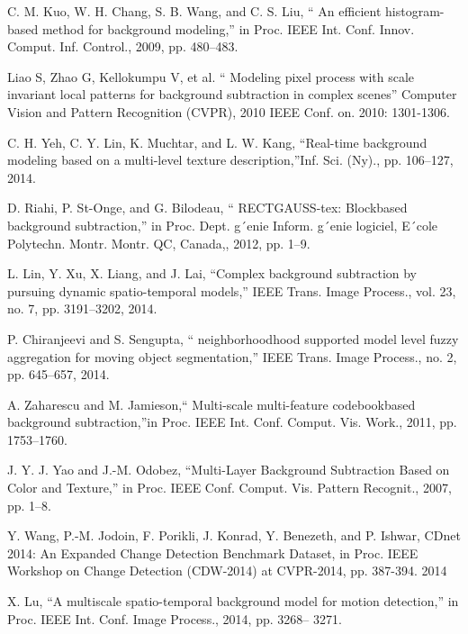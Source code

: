\documentclass[runningheads,a4paper]{llncs}
\begin{document}
\begin{thebibliography}{4}
 C. M. Kuo, W. H. Chang, S. B. Wang, and C. S. Liu, “
    An efficient histogram-based method for background modeling,” in Proc. IEEE
        Int. Conf. Innov. Comput. Inf. Control., 2009, pp. 480–483.

 Liao S, Zhao G, Kellokumpu V, et al. “ Modeling pixel
    process with scale invariant local patterns for background subtraction in
        complex scenes” Computer Vision and Pattern Recognition (CVPR), 2010
        IEEE Conf. on. 2010: 1301-1306.

     C. H. Yeh, C. Y. Lin, K. Muchtar, and L. W.
        Kang, “Real-time background modeling based on a multi-level texture
        description,”Inf. Sci. (Ny)., pp. 106–127, 2014.

 D. Riahi, P. St-Onge, and G. Bilodeau, “
    RECTGAUSS-tex: Blockbased background subtraction,” in Proc. Dept. g´enie
        Inform. g´enie logiciel, E´cole Polytechn. Montr. Montr. QC, Canada,,
        2012, pp. 1–9.

 L. Lin, Y. Xu, X. Liang, and J. Lai, “Complex
    background subtraction by pursuing dynamic spatio-temporal models,” IEEE
    Trans. Image Process., vol. 23, no. 7, pp. 3191–3202, 2014.

 P. Chiranjeevi and S. Sengupta, “
    neighborhoodhood supported model level fuzzy aggregation for moving object
    segmentation,” IEEE Trans. Image Process., no. 2, pp. 645–657, 2014.

 A. Zaharescu and M. Jamieson,“
    Multi-scale multi-feature codebookbased background subtraction,”in Proc.
    IEEE Int. Conf. Comput. Vis. Work., 2011, pp. 1753–1760.

 J. Y. J. Yao and J.-M. Odobez, “Multi-Layer
    Background Subtraction Based on Color and Texture,” in Proc. IEEE Conf.
    Comput. Vis. Pattern Recognit., 2007, pp. 1–8.

 Y. Wang, P.-M. Jodoin, F. Porikli, J. Konrad, Y.
    Benezeth, and P. Ishwar, CDnet 2014: An Expanded Change Detection Benchmark
    Dataset, in Proc. IEEE Workshop on Change Detection (CDW-2014) at
    CVPR-2014, pp. 387-394. 2014

 X. Lu, “A multiscale spatio-temporal
    background model for motion detection,” in Proc. IEEE Int. Conf. Image
    Process., 2014, pp. 3268– 3271.


\end{thebibliography}
\end{document}
